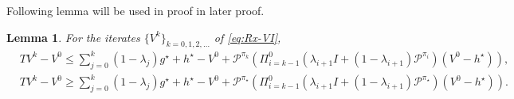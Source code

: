 \documentclass{article} %
\newcommand{\cP}{\mathcal{P}}
\newcommand*{\para}[1]{\left({#1}\right)}
\newtheorem{lemma}{Lemma}
\begin{document}
Following lemma will be used in proof in later proof. 
\begin{lemma}\label{lem::KM_expansion_2}
For the iterates $\{V^k\}_{k=0, 1,2,\dots}$ of \ref{eq:Rx-VI},
\begin{align*}
    & TV^k-V^0 \le \sum^{k}_{j=0} (1-\lambda_{j})g^{\star}+h^{\star}-V^0+\cP^{\pi_k}\para{ \Pi^{0}_{i=k-1}(\lambda_{i+1}I+(1-\lambda_{i+1}) \cP^{\pi_i}) (V^0-h^{\star})}, 
    \\&TV^k-V^0\ge \sum^{k}_{j=0} (1-\lambda_{j})g^{\star} +h^{\star}-V^0+\cP^{\pi_{\star}}\para{ \Pi^{0}_{i=k-1}(\lambda_{i+1}I+(1-\lambda_{i+1}) \cP^{\pi_{\star}}) (V^0-h^{\star})}.
\end{align*}
\end{lemma} 
\end{document}

